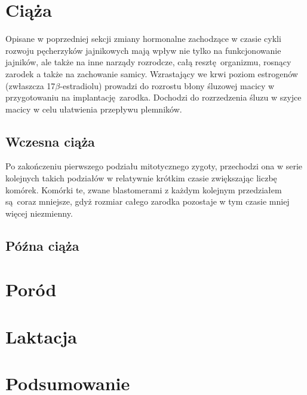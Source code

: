 \documentclass[two column, twoside, a4paper]{article}
\begin{document}
\section{Ciąża}

Opisane w poprzedniej sekcji zmiany hormonalne zachodzące w czasie cykli rozwoju pęcherzyków jajnikowych mają wpływ nie tylko na funkcjonowanie jajników, ale także na inne narządy rozrodcze, całą resztę organizmu, rosnący zarodek a także na zachowanie samicy. Wzrastający we krwi poziom estrogenów (zwłaszcza 17$\beta$-estradiolu) prowadzi do rozrostu błony śluzowej macicy w przygotowaniu na implantację zarodka. Dochodzi do rozrzedzenia śluzu w szyjce macicy w celu ułatwienia przepływu plemników. \autocite{Sawicki2017, Sadler2012}

\subsection{Wczesna ciąża}

Po zakończeniu pierwszego podziału mitotycznego zygoty, przechodzi ona w serie kolejnych takich podziałów w relatywnie krótkim czasie zwiększając liczbę komórek. Komórki te, zwane blastomerami z każdym kolejnym przedziałem są coraz mniejsze, gdyż rozmiar całego zarodka pozostaje w tym czasie mniej więcej niezmienny.



\subsection{Późna ciąża}

\section{Poród}

\section{Laktacja}

\section{Podsumowanie}


\printbibliography
\end{document}
